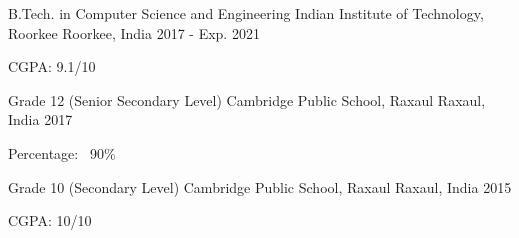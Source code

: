 

\begin{cventries}

  \cventry
    {B.Tech. in Computer Science and Engineering} %
    {Indian Institute of Technology, Roorkee} %
    {Roorkee, India} %
    {2017 - Exp. 2021} %
    {
      \begin{cvitems} %
        \item {CGPA: 9.1/10}
      \end{cvitems}
    }
  \cventry
    {Grade 12 (Senior Secondary Level)} %
    {Cambridge Public School, Raxaul} %
    {Raxaul, India} %
    {2017} %
    {
      \begin{cvitems} %
        \item {Percentage: ~90\%}
      \end{cvitems}
    }

    \cventry
        {Grade 10 (Secondary Level)} %
        {Cambridge Public School, Raxaul} %
        {Raxaul, India} %
        {2015} %
        {
          \begin{cvitems} %
            \item {CGPA: 10/10}
          \end{cvitems}
        }
\end{cventries}
